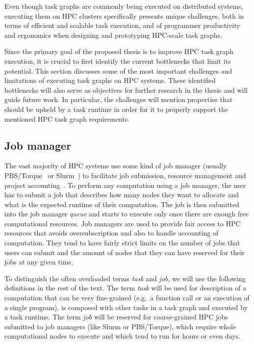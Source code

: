 Even though task graphs are commonly being executed on distributed systems,
executing them on HPC clusters specifically presents unique challenges, both in terms of
efficient and scalable task execution, and of programmer productivity and ergonomics when
designing and prototyping HPC-scale task graphs.


Since the primary goal of the proposed thesis is to improve HPC task graph execution, it is crucial
to first identify the current bottlenecks that limit its potential. This section discusses some
of the most important challenges and limitations of executing task graphs on HPC systems. These
identified bottlenecks will also serve as objectives for further research in the thesis and will
guide future work. In particular, the challenges will mention properties that should be upheld
by a task runtime in order for it to properly support the mentioned HPC task graph requirements.

\subsection{Job manager}
The vast majority of HPC systems use some kind of job manager (usually PBS/Torque~\cite{pbs} or
Slurm~\cite{slurm}) to facilitate job submission, resource management and project
accounting~\cite{slurm-schedmd}. To perform any computation using a job manager, the user has to
submit a job that describes how many nodes they want to allocate and what is the expected
runtime of their computation. The job is then submitted into the job manager \emph{queue} and
starts to execute only once there are enough free computational resources. Job managers are used to
provide fair access to HPC resources that avoids oversubscription and also to handle accounting
of computation. They tend to have fairly strict limits on the number of jobs that users can submit
and the amount of nodes that they can have reserved for their jobs at any given time.

To distinguish the often overloaded terms \emph{task} and \emph{job}, we will use the following
definitions in the rest of the text. The term \emph{task} will be used for description of a
computation that can be very fine-grained (e.g.\ a function call or an execution of a single
program), is composed with other tasks in a task graph and executed by a task runtime. The term
\emph{job} will be reserved for coarse-grained HPC jobs submitted to job managers (like Slurm or
PBS/Torque), which require whole computational nodes to execute and which tend to run for hours
or even days.

